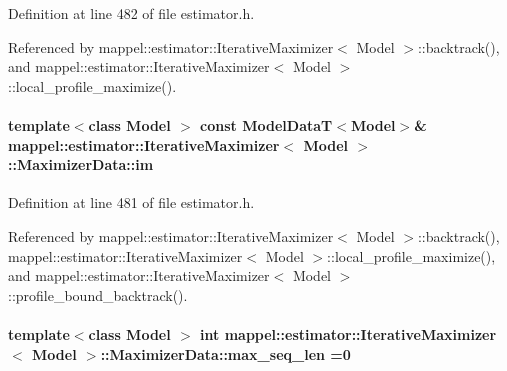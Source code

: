 Definition at line 482 of file estimator.\+h.



Referenced by mappel\+::estimator\+::\+Iterative\+Maximizer$<$ Model $>$\+::backtrack(), and mappel\+::estimator\+::\+Iterative\+Maximizer$<$ Model $>$\+::local\+\_\+profile\+\_\+maximize().

\paragraph[{\texorpdfstring{im}{im}}]{\setlength{\rightskip}{0pt plus 5cm}template$<$class Model $>$ const {\bf Model\+DataT}$<$Model$>$\& {\bf mappel\+::estimator\+::\+Iterative\+Maximizer}$<$ Model $>$\+::Maximizer\+Data\+::im}\hypertarget{classmappel_1_1estimator_1_1IterativeMaximizer_1_1MaximizerData_a01a762941a06e7f6839817971674c354}{}\label{classmappel_1_1estimator_1_1IterativeMaximizer_1_1MaximizerData_a01a762941a06e7f6839817971674c354}


Definition at line 481 of file estimator.\+h.



Referenced by mappel\+::estimator\+::\+Iterative\+Maximizer$<$ Model $>$\+::backtrack(), mappel\+::estimator\+::\+Iterative\+Maximizer$<$ Model $>$\+::local\+\_\+profile\+\_\+maximize(), and mappel\+::estimator\+::\+Iterative\+Maximizer$<$ Model $>$\+::profile\+\_\+bound\+\_\+backtrack().

\paragraph[{\texorpdfstring{max\+\_\+seq\+\_\+len}{max_seq_len}}]{\setlength{\rightskip}{0pt plus 5cm}template$<$class Model $>$ int {\bf mappel\+::estimator\+::\+Iterative\+Maximizer}$<$ Model $>$\+::Maximizer\+Data\+::max\+\_\+seq\+\_\+len =0\hspace{0.3cm}{\ttfamily [protected]}}\hypertarget{classmappel_1_1estimator_1_1IterativeMaximizer_1_1MaximizerData_a02b371b8d27f7458223b7442d9f6b55c}{}\label{classmappel_1_1estimator_1_1IterativeMaximizer_1_1MaximizerData_a02b371b8d27f7458223b7442d9f6b55c}


